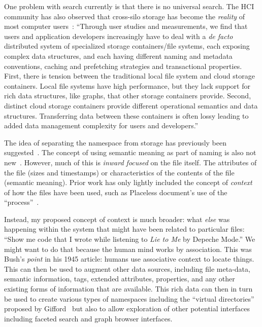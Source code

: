 One problem with search currently is that there is no universal search.
The \ac{HCI} community has also observed that cross-silo storage has become the
\emph{reality} of most computer users~\cite{Thereska2013}: ``Through user
studies and measurements, we find that users and application developers
increasingly have to deal with a \emph{de facto} distributed system of
specialized storage containers/file systems, each exposing complex data
structures, and each having different naming and metadata conventions, caching
and prefetching strategies and transactional properties. First, there is tension
between the traditional local file system and cloud storage containers.
Local file systems have high performance, but they lack
support for rich data structures, like graphs, that other
storage containers provide. Second, distinct cloud storage
containers provide different operational semantics
and data structures. Transferring data between these containers
is often lossy leading to added data management
complexity for users and developers.''

The idea of separating the namespace from storage has previously been
suggested~\cite{mogul1986representing,placeless-tois}.  The concept of using
semantic meaning as part of naming is also not new~\cite{gifford1991semantic}.
However, much of this is \emph{inward focused} on the file itself.  The
attributes of the file (sizes and timestamps) or characteristics of the contents
of the file (semantic meaning).  Prior work has only lightly included the concept of
\emph{context} of how the files have been used, such as Placeless document's use
of the ``process''~\cite{dourish1999getting}.

Instead, my proposed concept of context is much broader: what \emph{else} was
happening within the system that might have been related to particular files:
``Show me code that I wrote while listening to \emph{Lie to Me} by Depeche
Mode.'' We might want to do that because the human mind works by association.
This was Bush's \emph{point} in his 1945 article: humans use associative context
to locate things.  This can then be used to augment other data sources,
including file meta-data, semantic information, tags, extended attributes,
properties, and any other existing forms of information that are available.
This rich data can then in turn be used to create various types of namespaces
including the ``virtual directories'' proposed by
Gifford~\cite{gifford1991semantic} but also to allow exploration of other
potential interfaces including faceted search and graph browser interfaces.

